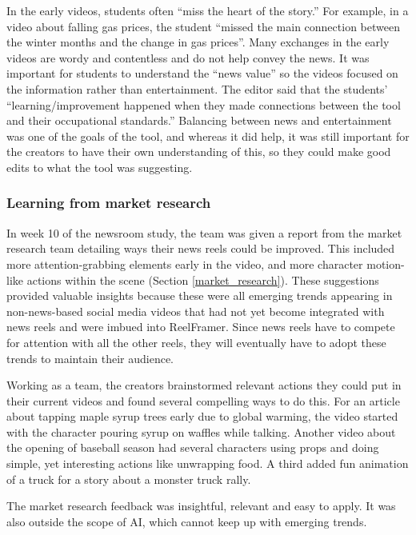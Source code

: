 In the early videos, students often ``miss the heart of the story.''
For example, in a video about falling gas prices, the student ``missed the main connection between the winter months and the change in gas prices''. 
Many exchanges in the early videos are wordy and contentless and do not help convey the news.
It was important for students to understand the “news value” so the videos focused on the information rather than entertainment. 
The editor said that the students' ``learning/improvement happened when they made connections between the tool and their occupational standards.'' 
Balancing between news and entertainment was one of the goals of the tool, and whereas it did help, it was still important for the creators to have their own understanding of this, so they could make good edits to what the tool was suggesting.

\color{black}


\subsubsection{Learning from market research}
In week 10 of the newsroom study, the team was given a report from the market research team detailing ways their news reels could be improved. 
This included more attention-grabbing elements early in the video, and more character motion-like actions within the scene (Section \ref{market_research}). 
These suggestions provided valuable insights because these were all emerging trends appearing in non-news-based social media videos that had not yet become integrated with news reels and were imbued into ReelFramer. 
Since news reels have to compete for attention with all the other reels, they will eventually have to adopt these trends to maintain their audience. 

Working as a team, the creators brainstormed relevant actions they could put in their current videos and found several compelling ways to do this. 
For an article about tapping maple syrup trees early due to global warming, the video started with the character pouring syrup on waffles while talking. 
Another video about the opening of baseball season had several characters using props and doing simple, yet interesting actions like unwrapping food. 
A third added fun animation of a truck for a story about a monster truck rally. 

The market research feedback was insightful, relevant and easy to apply. 
It was also outside the scope of AI, which cannot keep up with emerging trends. 
